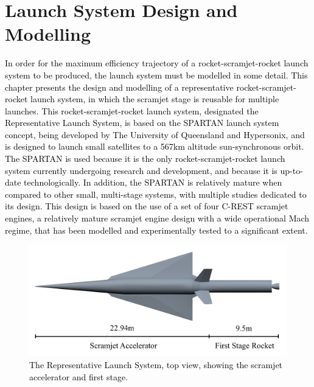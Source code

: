 
\cleardoublepage
\chapter{Launch System Design and Modelling}\label{chapter:Design}

\textcolor{black}{
	In order for the maximum efficiency trajectory of a rocket-scramjet-rocket launch system to be produced, the launch system must be modelled in some detail.
	This chapter presents the design and modelling of a representative rocket-scramjet-rocket launch system, in which the scramjet stage is reusable for multiple launches. 
		This rocket-scramjet-rocket launch system, designated the Representative Launch System, is based on the SPARTAN launch system concept\cite{Preller2017b,Jazra2013}, being developed by The University of Queensland and Hypersonix\cite{Hypersonix}, and is designed to launch small satellites to a 567km altitude sun-synchronous orbit.
		The SPARTAN is used because it is the only rocket-scramjet-rocket launch system currently undergoing research and development, 
		 and because it is up-to-date technologically. In addition, the SPARTAN is relatively mature when compared to other small, multi-stage systems, with multiple studies dedicated to its design\cite{Preller2018,Jazra2013,Whitside2020}. This design is based on the use of a set of four C-REST scramjet engines, a relatively mature scramjet engine design with a wide operational Mach regime, that has been modelled and experimentally tested to a significant extent\cite{Whitside,Turner,Barth,Curran,Smart1999,Smart2006,Smart2009,Smart2009b,Smart2012,Suraweera2009}.   
		 \begin{figure}[ht]
		 	\centering
		 	\includegraphics[width=0.85\linewidth]{figures/3_vehicle_design/NoInternal}
		 	\caption{The Representative Launch System, top view, showing the scramjet accelerator and first stage. }
		 	\label{fig:NoInternal}
		 \end{figure}
		 \begin{figure}[ht]

\end{figure}}
